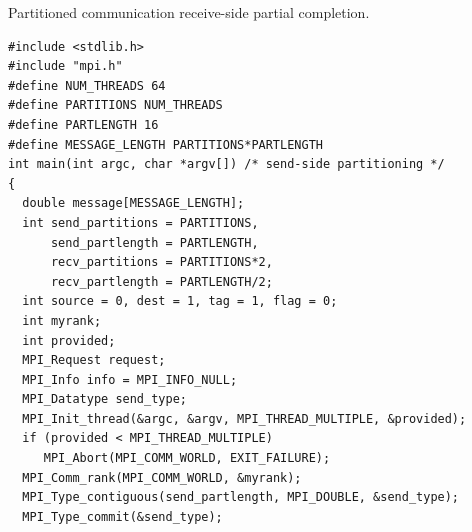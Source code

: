 \begin{example}
\label{partexample4}
%
%
Partitioned communication receive-side partial completion.\\
\begin{lstlisting}[language={[MPI]C}]
#include <stdlib.h>
#include "mpi.h"
#define NUM_THREADS 64
#define PARTITIONS NUM_THREADS
#define PARTLENGTH 16
#define MESSAGE_LENGTH PARTITIONS*PARTLENGTH
int main(int argc, char *argv[]) /* send-side partitioning */
{
  double message[MESSAGE_LENGTH];
  int send_partitions = PARTITIONS,
      send_partlength = PARTLENGTH,
      recv_partitions = PARTITIONS*2,
      recv_partlength = PARTLENGTH/2;
  int source = 0, dest = 1, tag = 1, flag = 0;
  int myrank;
  int provided;
  MPI_Request request;
  MPI_Info info = MPI_INFO_NULL;
  MPI_Datatype send_type;
  MPI_Init_thread(&argc, &argv, MPI_THREAD_MULTIPLE, &provided);
  if (provided < MPI_THREAD_MULTIPLE)
     MPI_Abort(MPI_COMM_WORLD, EXIT_FAILURE);
  MPI_Comm_rank(MPI_COMM_WORLD, &myrank);
  MPI_Type_contiguous(send_partlength, MPI_DOUBLE, &send_type);
  MPI_Type_commit(&send_type);


\end{lstlisting}
\end{example}

